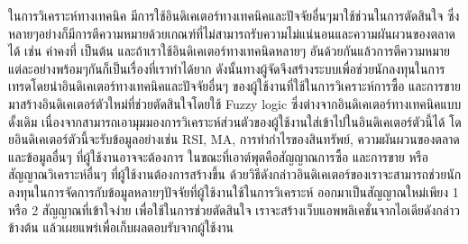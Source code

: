 \maketitle
\makesignature

\begin{abstractTH}
ในการวิเคราะห์ทางเทคนิค มีการใช้อินดิเคเตอร์ทางเทคนิคและปัจจัยอื่นๆมาใช้ช่วนในการตัดสินใจ ซึ่งหลายๆอย่างก็มีการตีความหมายด้วยเกณฑ์ที่ไม่สามารถรับความไม่แน่นอนและความผันผวนของตลาดได้
เช่น ค่าคงที่ เป็นต้น  และถ้าเราใช้อินดิเคเตอร์ทางเทคนิดหลายๆ อันด้วยกันแล้วการตีความหมายแต่ละอย่างพร้อมๆกันก็เป็นเรื่องที่เราทำได้ยาก 
ดังนั้นทางผู้จัดจึงสร้างระบบเพื่อช่วยนักลงทุนในการเทรดโดยนำอินดิเคเตอร์ทางเทคนิคและปัจจัยอื่นๆ 
ของผู้ใช้งานที่ใช้ในการวิเคราะห์การซื้อ และการขายมาสร้างอินดิเคเตอร์ตัวใหม่ที่ช่วยตัดสินใจโดยใช้ Fuzzy logic 
ซึ่งต่างจากอินดิเคเตอร์ทางเทคนิคแบบดั้งเดิม เนื่องจากสามารถเอามุมมองการวิเคราะห์ส่วนตัวของผู้ใช้งานใส่เข้าไปในอินดิเคเตอร์ตัวนี้ได้ โดยอินดิเคเตอร์ตัวนี้จะรับข้อมูลอย่างเช่น RSI, 
MA, การทำกำไรของสินทรัพย์, ความผันผวนของตลาด และข้อมูลอื่นๆ ที่ผู้ใช้งานอาจจะต้องการ ในขณะที่เอาต์พุตคือสัญญาณการซื้อ และการขาย หรือสัญญาณวิเคราะห์อื่นๆ 
ที่ผู้ใช้งานต้องการสร้างขึ้น ด้วยวิธีดังกล่าวอินดิเคเตอร์ของเราจะสามารถช่วยนักลงทุนในการจัดการกับข้อมูลหลายๆปัจจัยที่ผู้ใช้งานใช้ในการวิเคราะห์ ออกมาเป็นสัญญาณใหม่เพียง 1 หรือ 2 
สัญญาณที่เข้าใจง่าย เพื่อใช้ในการช่วยตัดสินใจ เราจะสร้างเว็บแอพพลิเคชั่นจากไอเดียดังกล่าวข้างต้น แล้วเผยแพร่เพื่อเก็บผลตอบรับจากผู้ใช้งาน
\end{abstractTH}

\contentspage
\figurelistpage
\tablelistpage




